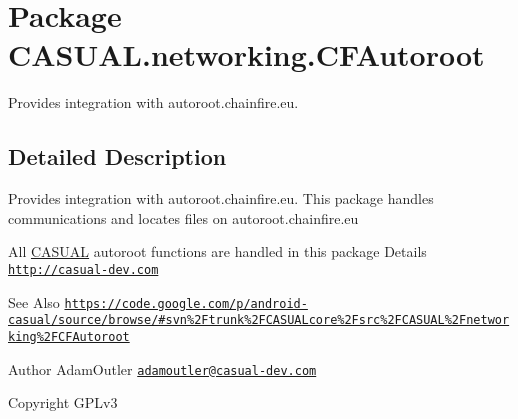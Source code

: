 \hypertarget{namespaceCASUAL_1_1networking_1_1CFAutoroot}{\section{Package C\-A\-S\-U\-A\-L.\-networking.\-C\-F\-Autoroot}
\label{namespaceCASUAL_1_1networking_1_1CFAutoroot}
}


Provides integration with autoroot.\-chainfire.\-eu.  




\subsection{Detailed Description}
Provides integration with autoroot.\-chainfire.\-eu. This package handles communications and locates files on autoroot.\-chainfire.\-eu

All \hyperlink{namespaceCASUAL}{C\-A\-S\-U\-A\-L} autoroot functions are handled in this package Details \href{http://casual-dev.com}{\tt http\-://casual-\/dev.\-com} \begin{DoxySeeAlso}{See Also}
\href{https://code.google.com/p/android-casual/source/browse/#svn%2Ftrunk%2FCASUALcore%2Fsrc%2FCASUAL%2Fnetworking%2FCFAutoroot}{\tt https\-://code.\-google.\-com/p/android-\/casual/source/browse/\#svn\%2\-Ftrunk\%2\-F\-C\-A\-S\-U\-A\-Lcore\%2\-Fsrc\%2\-F\-C\-A\-S\-U\-A\-L\%2\-Fnetworking\%2\-F\-C\-F\-Autoroot} 
\end{DoxySeeAlso}
\begin{DoxyAuthor}{Author}
Adam\-Outler \href{mailto:adamoutler@casual-dev.com}{\tt adamoutler@casual-\/dev.\-com} 
\end{DoxyAuthor}
\begin{DoxyCopyright}{Copyright}
G\-P\-Lv3 
\end{DoxyCopyright}
